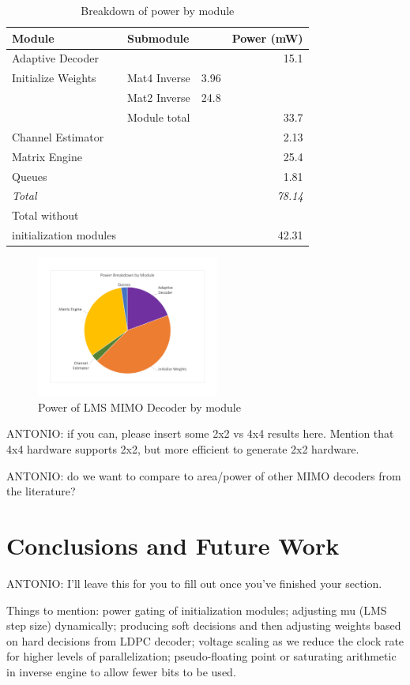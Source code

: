 \documentclass[journal]{IEEEtran}
\begin{document}
\begin{table}[!h]
\caption{Breakdown of power by module}
\label{power_breakdown_table}
\centering
\begin{tabular}{l l l r}
\hline
Module & Submodule & & Power (mW) \\
\hline
Adaptive Decoder & & & 15.1 \\
Initialize Weights & Mat4 Inverse & 3.96 & \\
 & Mat2 Inverse & 24.8 & \\
 & Module total & & 33.7 \\
Channel Estimator & & & 2.13 \\
Matrix Engine & & & 25.4 \\
Queues & & & 1.81 \\
\hline
\em{Total} & & & \em{78.14} \\
Total without & & & \\
initialization modules & & & 42.31 \\
\hline
\end{tabular}
\end{table}

\begin{figure}[!h]
\centering
\includegraphics*[width=6cm, viewport = 90 100 660 540]{images/power_breakdown_module.pdf}
\caption{Power of LMS MIMO Decoder by module}
\label{power_breakdown_module}
\end{figure}

ANTONIO: if you can, please insert some 2x2 vs 4x4 results here. Mention that 4x4 hardware supports 2x2, but more efficient to generate 2x2 hardware.

ANTONIO: do we want to compare to area/power of other MIMO decoders from the literature?


\section{Conclusions and Future Work}

ANTONIO: I'll leave this for you to fill out once you've finished your section.

Things to mention: power gating of initialization modules; adjusting mu (LMS step size) dynamically; producing soft decisions and then adjusting weights based on hard decisions from LDPC decoder; voltage scaling as we reduce the clock rate for higher levels of parallelization; pseudo-floating point or saturating arithmetic in inverse engine to allow fewer bits to be used.





\end{document}
